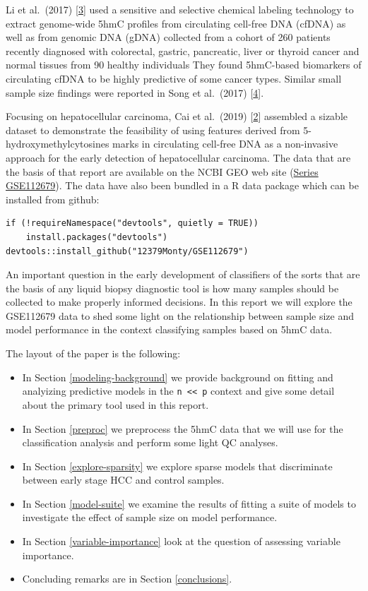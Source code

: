 \documentclass[
]{book}
\begin{document}
Li et al.~(2017) {[}\protect\hyperlink{ref-Li:2017aa}{3}{]} used a sensitive and selective chemical labeling technology
to extract genome-wide 5hmC profiles from circulating cell-free DNA (cfDNA)
as well as from genomic DNA (gDNA)
collected from a cohort of 260 patients recently diagnosed with colorectal,
gastric, pancreatic, liver or thyroid cancer and normal tissues from 90 healthy individuals
They found 5hmC-based biomarkers of circulating cfDNA to be highly predictive of some cancer types.
Similar small sample size findings were reported in Song et al.~(2017) {[}\protect\hyperlink{ref-Song:2017aa}{4}{]}.

Focusing on hepatocellular carcinoma, Cai et al.~(2019) {[}\protect\hyperlink{ref-Cai:2019aa}{2}{]} assembled a sizable dataset
to demonstrate the feasibility of using features derived from
5-hydroxymethylcytosines marks in circulating cell-free DNA as
a non-invasive approach for the early detection of
hepatocellular carcinoma. The data that are the basis of that
report are available on the NCBI GEO web site
(\href{https://www.ncbi.nlm.nih.gov/geo/query/acc.cgi?acc=GSE112679}{Series GSE112679}).
The data have also been bundled in a R data package which can be installed from github:

\begin{verbatim}
if (!requireNamespace("devtools", quietly = TRUE))
    install.packages("devtools")
devtools::install_github("12379Monty/GSE112679")
\end{verbatim}

An important question in the early development of classifiers of the sorts
that are the basis of any liquid biopsy diagnostic tool is how many samples
should be collected to make properly informed decisions. In this
report we will explore the GSE112679 data to shed some light on
the relationship between sample size and model performance
in the context classifying samples based on 5hmC data.

The layout of the paper is the following:

\begin{itemize}
\item
  In Section \ref{modeling-background} we provide background on fitting and
  analyizing predictive models in the \texttt{n\ \textless{}\textless{}\ p} context and
  give some detail about the primary tool used in this report.
\item
  In Section \ref{preproc} we preprocess the 5hmC data that
  we will use for the classification analysis and perform some light QC analyses.
\item
  In Section \ref{explore-sparsity} we explore sparse models
  that discriminate between early stage HCC and control samples.
\item
  In Section \ref{model-suite} we examine the results of fitting a suite of models to
  investigate the effect of sample size on model performance.
\item
  In Section \ref{variable-importance} look at the question of assessing variable importance.
\item
  Concluding remarks are in Section \ref{conclusions}.
\end{itemize}
\end{document}
